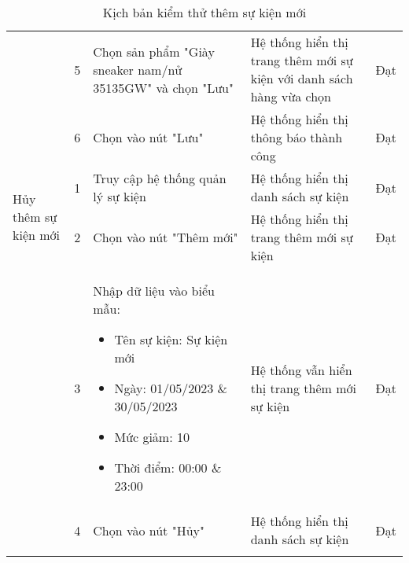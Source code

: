 {\begin{longtable}{| p{2.5cm}| p{1cm}| p{5.5cm}| p{4.5cm} | p{1.5cm} |}
                                                     & 5                                            & Chọn sản phẩm "Giày sneaker nam/nử 35135GW" và chọn "Lưu" & Hệ thống hiển thị trang thêm mới sự kiện với danh sách hàng vừa chọn & Đạt             \\
        \cline{2-5}
                                                     & 6                                            & Chọn vào nút "Lưu"                                        & Hệ thống hiển thị thông báo thành công                               & Đạt             \\
        \hline
        \multirow[t]{2}{2.5cm}{Hủy thêm sự kiện mới} & 1                                            & Truy cập hệ thống quản lý sự kiện                         & Hệ thống hiển thị danh sách sự kiện                                  & Đạt             \\
        \cline{2-5}
                                                     & 2                                            & Chọn vào nút "Thêm mới"                                   & Hệ thống hiển thị trang thêm mới sự kiện                             & Đạt             \\
        \cline{2-5}
                                                     & 3                                            & Nhập dữ liệu vào biểu mẫu:
        \begin{itemize}
            \item Tên sự kiện: Sự kiện mới
            \item Ngày: 01/05/2023 \& 30/05/2023
            \item Mức giảm: 10
            \item Thời điểm: 00:00 \& 23:00
        \end{itemize}         & Hệ thống vẫn hiển thị trang thêm mới sự kiện & Đạt                                                                                                                                                                       \\
        \cline{2-5}
                                                     & 4                                            & Chọn vào nút "Hủy"                                        & Hệ thống hiển thị danh sách sự kiện                                  & Đạt             \\
        \hline
        \caption{Kịch bản kiểm thử thêm sự kiện mới}
    \end{longtable}
}


